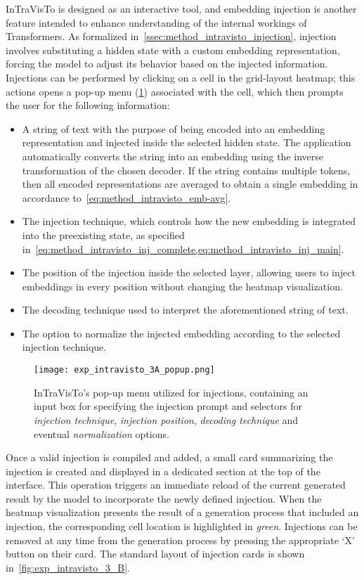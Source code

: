 InTraVisTo is designed as an interactive tool, and embedding injection is another feature intended to enhance understanding of the internal workings of Transformers.
As formalized in~\cref{ssec:method_intravisto_injection}, injection involves substituting a hidden state with a custom embedding representation, forcing the model to adjust its behavior based on the injected information.
Injections can be performed by clicking on a cell in the grid-layout heatmap; this actions opens a pop-up menu (\cref{fig:exp_intravisto_3_A}) associated with the cell, which then prompts the user for the following information:
\begin{itemize}
    \item A string of text with the purpose of being encoded into an embedding representation and injected inside the selected hidden state.
The application automatically converts the string into an embedding using the inverse transformation of the chosen decoder.
If the string contains multiple tokens, then all encoded representations are averaged to obtain a single embedding in accordance to~\cref{eq:method_intravisto_emb-avg}.
    \item The injection technique, which controls how the new embedding is integrated into the preexisting state, as specified in~\cref{eq:method_intravisto_inj_complete,eq:method_intravisto_inj_main}.
    \item The position of the injection inside the selected layer, allowing users to inject embeddings in every position without changing the heatmap visualization.
    \item The decoding technique used to interpret the aforementioned string of text.
    \item The option to normalize the injected embedding according to the selected injection technique.
\end{itemize}

\begin{figure}[t!]
    \centering
    \texttt{[image: exp\_intravisto\_3A\_popup.png]}
    \caption[InTraVisTo's pop-up menu utilized for injections.]{InTraVisTo's pop-up menu utilized for injections, containing an input box for specifying the injection prompt and selectors for \emph{injection technique}, \emph{injection position}, \emph{decoding technique} and eventual \emph{normalization} options.}
    \label{fig:exp_intravisto_3_A}
\end{figure}

Once a valid injection is compiled and added, a small card summarizing the injection is created and displayed in a dedicated section at the top of the interface.
This operation triggers an immediate reload of the current generated result by the model to incorporate the newly defined injection.
When the heatmap visualization presents the result of a generation process that included an injection, the corresponding cell location is highlighted in \emph{green}.
Injections can be removed at any time from the generation process by pressing the appropriate `X' button on their card.
The standard layout of injection cards is shown in~\cref{fig:exp_intravisto_3_B}.


